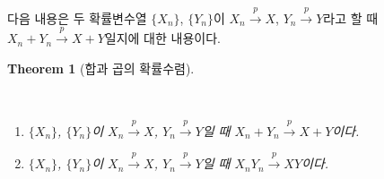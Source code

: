 \documentclass[
  letterpaper,
  DIV=11,
  numbers=noendperiod]{scrreprt}
\theoremstyle{definition}
\theoremstyle{plain}
\newtheorem{theorem}{Theorem}[chapter]
\theoremstyle{plain}
\theoremstyle{definition}
\theoremstyle{plain}
\theoremstyle{definition}
\theoremstyle{remark}
\begin{document}
다음 내용은 두 확률변수열 \(\{X_n\}\), \(\{Y_n\}\)이
\(X_n \stackrel{p}{\rightarrow} X\),
\(Y_n \stackrel{p}{\rightarrow} Y\)라고 할 때
\(X_n + Y_n \stackrel{p}{\rightarrow} X+Y\)일지에 대한 내용이다.

\begin{theorem}[합과 곱의
확률수렴]\protect\hypertarget{thm-probconvsumprod}{}\label{thm-probconvsumprod}

~

\begin{enumerate}
\def\labelenumi{\arabic{enumi}.}
\item
  \(\{X_n\}\), \(\{Y_n\}\)이 \(X_n \stackrel{p}{\rightarrow} X\),
  \(Y_n \stackrel{p}{\rightarrow} Y\)일 때
  \(X_n + Y_n \stackrel{p}{\rightarrow} X+Y\)이다.
\item
  \(\{X_n\}\), \(\{Y_n\}\)이 \(X_n \stackrel{p}{\rightarrow} X\),
  \(Y_n \stackrel{p}{\rightarrow} Y\)일 때
  \(X_n  Y_n \stackrel{p}{\rightarrow} XY\)이다.
\end{enumerate}

\end{theorem}
\end{document}
